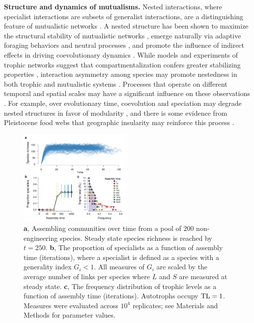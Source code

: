 \documentclass[twocolumn,preprintnumbers,amsmath,amssymb,superscriptaddress,linenumbers]{revtex4-1}
\begin{document}
\vspace{0mm}
\noindent \textbf{Structure and dynamics of mutualisms.}
Nested interactions, where specialist interactions are subsets of generalist interactions, are a distinguishing feature of mutualistic networks \cite{Bascompte2003}.
A nested structure has been shown to maximize the structural stability of mutualistic networks \cite{Rohr2014}, emerge naturally via adaptive foraging behaviors \cite{Valdovinos2016,Valdovinos2019} and neutral processes \cite{Krishna2008}, and promote the influence of indirect effects in driving coevolutionary dynamics \cite{Guimaraes2017}.
While models and experiments of trophic networks suggest that compartmentalization confers greater stabilizing properties \cite{Stouffer2011,Gilarranz2017}, interaction asymmetry among species may promote nestedness in both trophic \cite{Araujo2010} and mutualistic systems \cite{Pires2011}.
Processes that operate on different temporal and spatial scales may have a significant influence on these observations \cite{Massol2011}.
For example, over evolutionary time, coevolution and speciation may degrade nested structures in favor of modularity \cite{Ponisio2019}, and there is some evidence from Pleistocene food webs that geographic insularity may reinforce this process \cite{Yeakel2013}.

\vspace{0mm}
\begin{figure}[h!]
\centering
\includegraphics[width=0.5\textwidth]{fig_trophic2.pdf}
\vspace{0mm}
\caption{
\textbf{a}, Assembling communities over time from a pool of 200 non-engineering species. 
Steady state species richness is reached by $t=250$.
\textbf{b}, The proportion of specialists as a function of assembly time (iterations), where a specialist is defined as a species with a generality index $G_i < 1$.
All measures of $G_i$ are scaled by the average number of links per species where $L$ and $S$ are measured at steady state.
\textbf{c}, The frequency distribution of trophic levels as a function of assembly time (iterations). 
Autotrophs occupy ${\rm TL}=1$.
Measures were evaluated across $10^4$ replicates; see Materials and Methods for parameter values.
\vspace{0mm}
}
\label{fig:trophic}
\end{figure}
\end{document}
